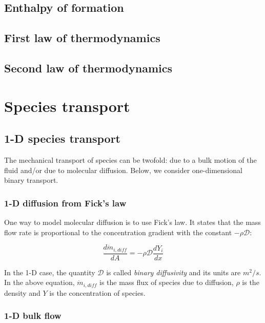 \documentclass[10pt,twocolumn]{article}
\begin{document}
\subsection{Enthalpy of formation}


\subsection{First law of thermodynamics}


\subsection{Second law of thermodynamics}



\section{Species transport}

\subsection{1-D species transport}

The mechanical transport of species can be twofold: due to a bulk motion of the fluid and/or due to molecular diffusion. Below, we consider one-dimensional binary transport.

\subsubsection{1-D diffusion from Fick's law}

One way to model molecular diffusion is to use Fick's law. It states that the mass flow rate is proportional to the concentration gradient with the constant $-\rho \mathcal{D}$:

\begin{equation}
\frac{d \dot{m}_{i, diff}}{dA} = - \rho \mathcal{D} \frac{d Y_i}{dx}
\end{equation}

In the 1-D case, the quantity $\mathcal{D}$ is called \textit{binary diffusivity} and its units are $m^2/s$. In the above equation, $\dot{m}_{i, diff}$ is the mass flux of species due to diffusion, $\rho$ is the density and $Y$ is the concentration of species.

\subsubsection{1-D bulk flow}
\end{document}
